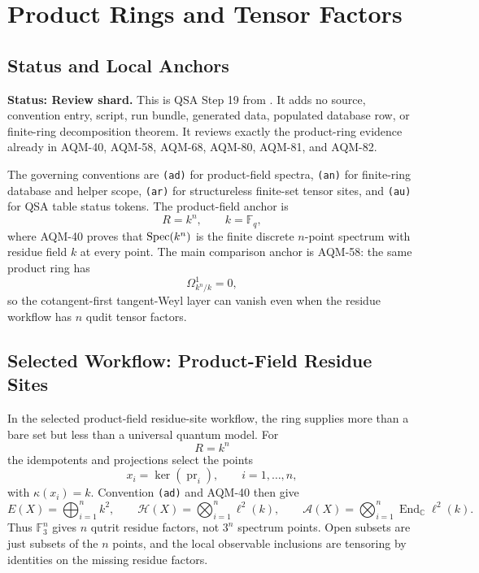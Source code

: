 
\section{Product Rings and Tensor Factors}
\label{sec:qsa-product-rings-tensor-factors}

\subsection{Status and Local Anchors}

\textbf{Status: Review shard.}  This is QSA Step 19 from
.  It adds no source,
convention entry, script, run bundle, generated data, populated database row,
or finite-ring decomposition theorem.  It reviews exactly the product-ring
evidence already in AQM-40, AQM-58, AQM-68, AQM-80, AQM-81, and AQM-82.

The governing conventions are \texttt{(ad)} for product-field spectra,
\texttt{(an)} for finite-ring database and helper scope, \texttt{(ar)} for
structureless finite-set tensor sites, and \texttt{(au)} for QSA table status
tokens.  The product-field anchor is
\[
  R=k^n,\qquad k=\mathbb F_q,
\]
where AQM-40 proves that \(\operatorname{Spec}(k^n)\) is the finite discrete \(n\)-point
spectrum with residue field \(k\) at every point.  The main comparison anchor
is AQM-58: the same product ring has
\[
  \Omega^1_{k^n/k}=0,
\]
so the cotangent-first tangent-Weyl layer can vanish even when the residue
workflow has \(n\) qudit tensor factors.

\subsection{Selected Workflow: Product-Field Residue Sites}

In the selected product-field residue-site workflow, the ring supplies more
than a bare set but less than a universal quantum model.  For
\[
  R=k^n
\]
the idempotents and projections select the points
\[
  x_i=\ker(\operatorname{pr}_i),\qquad i=1,\ldots,n,
\]
with \(\kappa(x_i)=k\).  Convention \texttt{(ad)} and AQM-40 then give
\[
  E(X)=\bigoplus_{i=1}^n k^2,\qquad
  \mathcal H(X)=\bigotimes_{i=1}^n\ell^2(k),\qquad
  \mathcal A(X)=\bigotimes_{i=1}^n
    \operatorname{End}_{\mathbb C}\ell^2(k).
\]
Thus \(\mathbb F_3^n\) gives \(n\) qutrit residue factors, not
\(3^n\) spectrum points.  Open subsets are just subsets of the \(n\)
points, and the local observable inclusions are tensoring by identities on
the missing residue factors.

